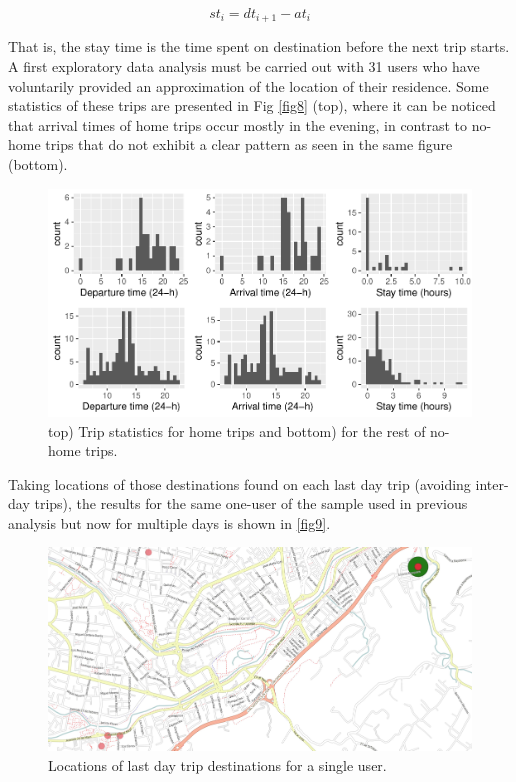 \documentclass[runningheads]{llncs}
\begin{document}
\begin{equation}
  st_i =  dt_{i+1} - at_i
\end{equation}

That is, the stay time is the time spent on destination before the next trip starts. A first exploratory data analysis must be carried out with 31 users who have voluntarily provided an approximation of the location of their residence. Some statistics of these trips are presented in Fig \ref{fig8} (top), where it can be noticed that arrival times of home trips occur mostly in the evening, in contrast to no-home trips that do not exhibit a clear pattern as seen in the same figure (bottom).

\begin{figure}

{\centering \includegraphics{conlatex_files/figure-latex/homes-plot-1} 

}

\caption{\label{fig8} top) Trip statistics for home trips and bottom) for the rest of no-home trips.}\label{fig:homes-plot}
\end{figure}

Taking locations of those destinations found on each last day trip (avoiding inter-day trips), the results for the same one-user of the sample used in previous analysis but now for multiple days is shown in \ref{fig9}.

\begin{figure}

{\centering \includegraphics[width=0.9\linewidth]{paper/images/homes} 

}

\caption{\label{fig9}Locations of last day trip destinations for a single user.}\label{fig:alldest-plot}
\end{figure}
\end{document}
